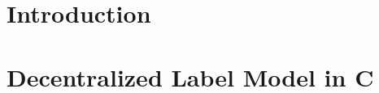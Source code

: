 %
%
%
%
%


\usetikzlibrary{arrows}
\pagestyle{empty} %
\listoftodos
\clearpage
{} %



\cleardoublepage
{}
\pagestyle{fancy} %
\tableofcontents


\cleardoublepage

\chapter{Introduction}\label{introduction}








\chapter{Decentralized Label Model in C}\label{ctif}




